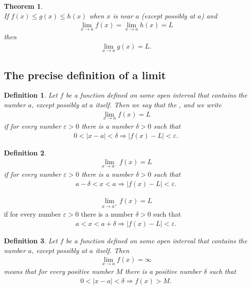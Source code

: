 \documentclass{article}
\theoremstyle{sltheorem}
\newtheorem{definition}{Definition}[section]
\newtheorem{theorem}{Theorem}[section]
\begin{document}
\begin{theorem}
    \\
    If $f(x)\leq g(x)\leq h(x)$ when $x$ is near $a$ (except possibly at $a$) and
    \begin{align*}
        \lim_{x\to a}f(x) = \lim_{x\to a}h(x) = L
    \end{align*}
    then
    \begin{align*}
        \lim_{x \to a}g(x) = L.
    \end{align*}
\end{theorem}
\subsection{The precise definition of a limit}
\begin{definition}
    Let $f$ be a function defined on some open interval that contains the number $a$, except possibly at $a$ itself. Then we say that the , and we write
    \begin{align*}
        \lim_{x\to a}f(x) = L
    \end{align*}
    if for every number $\varepsilon>0$ there is a number $\delta>0$ such that
    \begin{align*}
        0<|x-a|<\delta \Rightarrow |f(x)-L|<\varepsilon.
    \end{align*}
\end{definition}
\begin{definition}
    \begin{align*}
        \lim_{x\to a^-}f(x) = L
    \end{align*}
    if for every number $\varepsilon > 0$ there is a number $\delta > 0$ such that
    \begin{align*}
        a-\delta < x < a \Rightarrow |f(x)-L| < \varepsilon.
    \end{align*}
\end{definition}
\begin{align*}
    \lim_{x\to a^+}f(x) = L
\end{align*}
    if for every number $\varepsilon > 0$ there is a number $\delta > 0$ such that
\begin{align*}
    a < x < a+\delta \Rightarrow |f(x)-L| < \varepsilon.
\end{align*}
\begin{definition}
    Let $f$ be a function defined on some open interval that contains the number $a$, except possibly at $a$ itself. Then
    \begin{align*}
        \lim_{x\to a}f(x) = \infty
    \end{align*}
    means that for every positive number $M$ there is a positive number $\delta$ such that
    \begin{align*}
        0<|x-a|<\delta \Rightarrow f(x)>M.
    \end{align*}
\end{definition}
\end{document}

